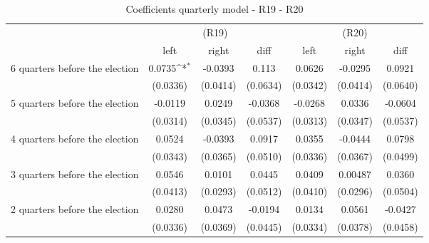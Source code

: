 \begin{table}[!ht]\centering \footnotesize
\def\sym#1{\ifmmode^{#1}\else\(^{#1}\)\fi}
\caption{Coefficients quarterly model - R19 - R20}
\begin{tabular}{l*{6}{c}}
\hline\hline
                    &\multicolumn{3}{c}{(R19)}&\multicolumn{3}{c}{(R20)}\\
&\multicolumn{1}{c}{left}&\multicolumn{1}{c}{right}&\multicolumn{1}{c}{diff}&\multicolumn{1}{c}{left}&\multicolumn{1}{c}{right}&\multicolumn{1}{c}{diff}\\
\hline
 6 quarters before the election&      0.0735\sym{*}  &     -0.0393         &       0.113         &      0.0626         &     -0.0295         &      0.0921         \\
                    &    (0.0336)         &    (0.0414)         &    (0.0634)         &    (0.0342)         &    (0.0414)         &    (0.0640)         \\
[0.5em]
 5 quarters before the election&     -0.0119         &      0.0249         &     -0.0368         &     -0.0268         &      0.0336         &     -0.0604         \\
                    &    (0.0314)         &    (0.0345)         &    (0.0537)         &    (0.0313)         &    (0.0347)         &    (0.0537)         \\
[0.5em]
 4 quarters before the election&      0.0524         &     -0.0393         &      0.0917         &      0.0355         &     -0.0444         &      0.0798         \\
                    &    (0.0343)         &    (0.0365)         &    (0.0510)         &    (0.0336)         &    (0.0367)         &    (0.0499)         \\
[0.5em]
 3 quarters before the election&      0.0546         &      0.0101         &      0.0445         &      0.0409         &     0.00487         &      0.0360         \\
                    &    (0.0413)         &    (0.0293)         &    (0.0512)         &    (0.0410)         &    (0.0296)         &    (0.0504)         \\
[0.5em]
 2 quarters before the election&      0.0280         &      0.0473         &     -0.0194         &      0.0134         &      0.0561         &     -0.0427         \\
                    &    (0.0336)         &    (0.0369)         &    (0.0445)         &    (0.0334)         &    (0.0378)         &    (0.0458)         \\

\end{tabular}
\end{table}
